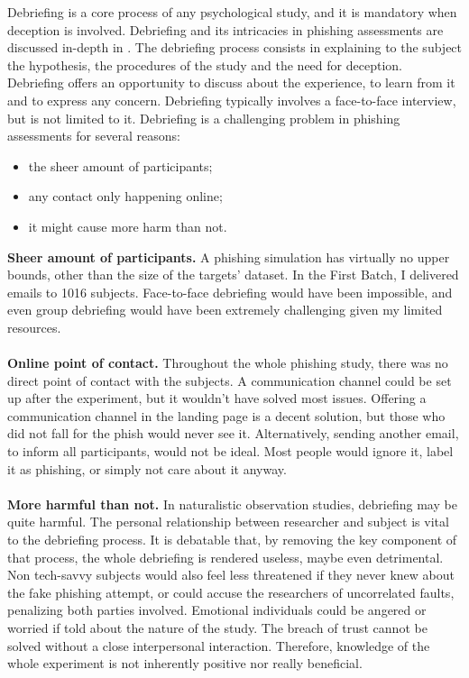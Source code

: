 \documentclass[a4paper]{article}
\begin{document}
Debriefing is a core process of any psychological study, and it is mandatory when deception is involved. Debriefing and its intricacies in phishing assessments are discussed in-depth in \cite{lit-other-ethics}. The debriefing process consists in explaining to the subject the hypothesis, the procedures of the study and the need for deception. Debriefing offers an opportunity to discuss about the experience, to learn from it and to express any concern. Debriefing typically involves a face-to-face interview, but is not limited to it. Debriefing is a challenging problem in phishing assessments for several reasons:

\begin{itemize}
    \item the sheer amount of participants;
    \item any contact only happening online;
    \item it might cause more harm than not.
\end{itemize}

\noindent
\textbf{Sheer amount of participants.} A phishing simulation has virtually no upper bounds, other than the size of the targets' dataset. In the First Batch, I delivered emails to 1016 subjects. Face-to-face debriefing would have been impossible, and even group debriefing would have been extremely challenging given my limited resources.
\\ \\
\textbf{Online point of contact.} Throughout the whole phishing study, there was no direct point of contact with the subjects. A communication channel could be set up after the experiment, but it wouldn't have solved most issues. Offering a communication channel in the landing page is a decent solution, but those who did not fall for the phish would never see it. Alternatively, sending another email, to inform all participants, would not be ideal. Most people would ignore it, label it as phishing, or simply not care about it anyway.
\\ \\ 
\textbf{More harmful than not.} In naturalistic observation studies, debriefing may be quite harmful. The personal relationship between researcher and subject is vital to the debriefing process. It is debatable that, by removing the key component of that process, the whole debriefing is rendered useless, maybe even detrimental. Non tech-savvy subjects would also feel less threatened if they never knew about the fake phishing attempt, or could accuse the researchers of uncorrelated faults, penalizing both parties involved. Emotional individuals could be angered or worried if told about the nature of the study. The breach of trust cannot be solved without a close interpersonal interaction. Therefore, knowledge of the whole experiment is not inherently positive nor really beneficial.
\end{document}
